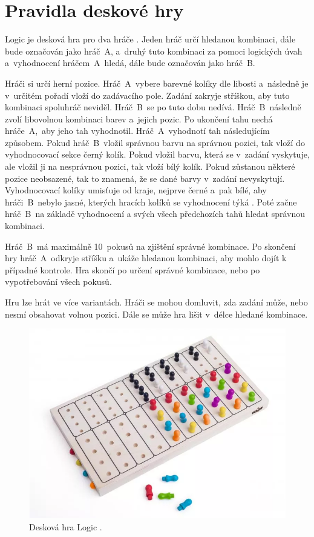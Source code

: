 \chapter{Pravidla deskové hry}
Logic je desková hra pro dva hráče \cite{Logic_pravidla}. Jeden hráč určí hledanou kombinaci, dále bude označován jako 
hráč~A, a~druhý tuto kombinaci za pomoci logických úvah a~vyhodnocení hráčem~A~hledá, dále bude označován jako hráč~B.

Hráči si určí herní pozice. Hráč~A~vybere barevné kolíky dle libosti a~následně je v~určitém pořadí vloží do zadávacího pole. Zadání zakryje
stříškou, aby tuto
kombinaci spoluhráč neviděl. Hráč~B~se po tuto dobu nedívá. Hráč~B~následně zvolí libovolnou kombinaci barev a~jejich pozic. Po 
ukončení tahu nechá
hráče~A,~aby jeho tah vyhodnotil. Hráč~A~vyhodnotí tah následujícím způsobem. Pokud hráč~B~vložil správnou barvu na správnou pozici, tak vloží 
do vyhodnocovací sekce černý kolík. Pokud vložil barvu, která se v~zadání vyskytuje, ale vložil ji na nesprávnou pozici, tak vloží bílý kolík.
Pokud zůstanou některé pozice neobsazené, tak to znamená, že se dané barvy v~zadání nevyskytují. 
Vyhodnocovací kolíky umisťuje od kraje, nejprve černé a~pak bílé, aby hráči~B~nebylo jasné, kterých hracích kolíků se vyhodnocení 
týká \cite{Logic_pravidla}.
Poté začne hráč~B~na základě vyhodnocení a svých všech předchozích tahů hledat správnou kombinaci.

Hráč~B~má maximálně 10~pokusů na zjištění správné kombinace. Po skončení hry hráč~A~odkryje stříšku a~ukáže hledanou kombinaci, aby mohlo dojít
k případné kontrole. Hra skončí po určení správné kombinace, nebo po vypotřebování všech pokusů.

Hru lze hrát ve více variantách. Hráči se mohou domluvit, zda zadání může, nebo nesmí obsahovat volnou pozici. Dále se může hra lišit v~délce hledané 
kombinace.

\begin{figure}[!h]
  \begin{center}
    \includegraphics[scale=0.6]{obrazky/Logic_deskovka.png}
  \end{center}
  \caption[Desková hra Logic \cite{Logic_deskovka}]{Desková hra Logic \cite{Logic_deskovka}.}
\end{figure}

